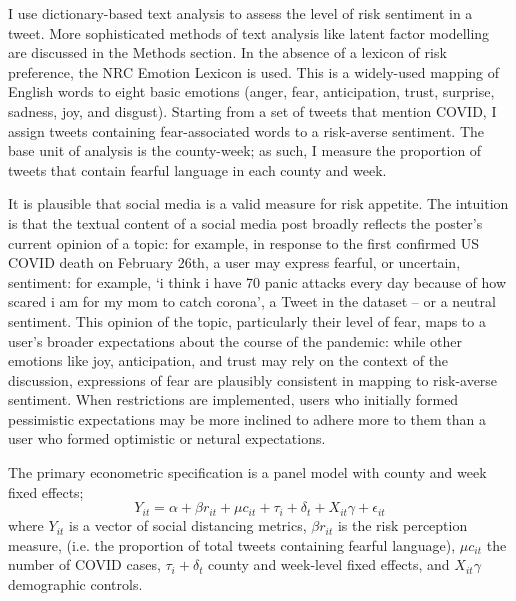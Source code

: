 \documentclass{article}
\begin{document}
I use dictionary-based text analysis to assess the level of risk sentiment in a tweet. More sophisticated methods of text analysis like latent factor modelling are discussed in the Methods section. In the absence of a lexicon of risk preference, the NRC Emotion Lexicon \parencite{mohammadCrowdsourcingWordEmotion2013} is used. This is a widely-used mapping of English words to eight basic emotions (anger, fear, anticipation, trust, surprise, sadness, joy, and disgust). Starting from a set of tweets that mention COVID, I assign tweets containing fear-associated words to a risk-averse sentiment. The base unit of analysis is the county-week; as such, I measure the proportion of tweets that contain fearful language in each county and week. 

It is plausible that social media is a valid measure for risk appetite. The intuition is that the textual content of a social media post broadly reflects the poster's current opinion of a topic: for example, in response to the first confirmed US COVID death on February 26th, a user may express fearful, or uncertain, sentiment: for example, `i think i have 70 panic attacks every day because of how scared i am for my mom to catch corona', a Tweet in the dataset -- or a neutral sentiment. This opinion of the topic, particularly their level of fear, maps to a user's broader expectations about the course of the pandemic: while other emotions like joy, anticipation, and trust may rely on the context of the discussion, expressions of fear are plausibly consistent in mapping to risk-averse sentiment. When restrictions are implemented, users who initially formed pessimistic expectations may be more inclined to adhere more to them than a user who formed optimistic or netural expectations. 

The primary econometric specification is a panel model with county and week fixed effects;
\[Y_{it} = \alpha + \beta r_{it} + \mu c_{it} + \tau_i + \delta_t +  X_{it}\gamma + \epsilon_{it}\]
where \(Y_{it}\) is a vector of social distancing metrics, \(\beta r_{it}\) is the risk perception measure, (i.e. the proportion of total tweets containing fearful language), \(\mu c_{it}\) the number of COVID cases, \(\tau_i + \delta_t\) county and week-level fixed effects, and \(X_{it}\gamma\) demographic controls.
\end{document}

